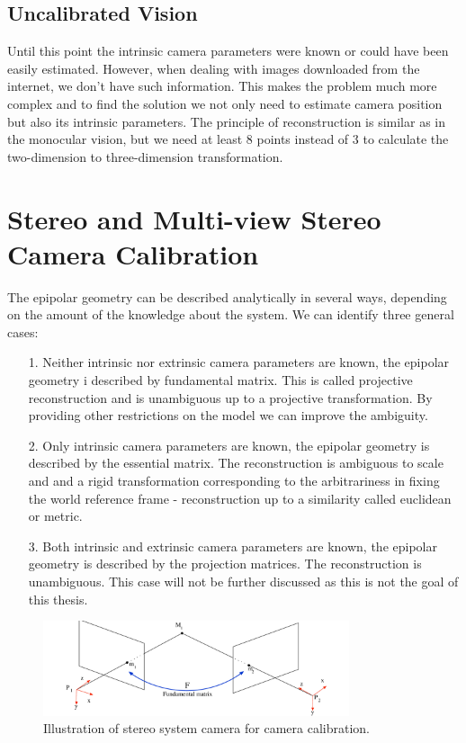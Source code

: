 \subsection*{Uncalibrated Vision}
Until this point the intrinsic camera parameters were known or could have been easily estimated. However, when dealing with images downloaded from the internet, we don't have such information. This makes the problem much more complex and to find the solution we not only need to estimate camera position but also its intrinsic parameters. The principle of reconstruction is similar as in the monocular vision, but we need at least 8 points instead of 3 to calculate the two-dimension to three-dimension transformation.

\section{Stereo and Multi-view Stereo Camera Calibration}
The epipolar geometry can be described analytically in several ways, depending on the amount of the knowledge about the system. We can identify three general cases:
\begin{itemize}
	\item[1.] Neither intrinsic nor extrinsic camera parameters are known, the epipolar geometry i described by fundamental matrix. This is called projective reconstruction and is unambiguous up to a projective transformation. By providing other restrictions on the model we can improve the ambiguity.
	\item[2.] Only intrinsic camera parameters are known, the epipolar geometry is described by the essential matrix. The reconstruction is ambiguous to scale and and a rigid transformation corresponding to the arbitrariness in fixing the world reference frame - reconstruction up to a similarity called euclidean or metric.
	\item[3.] Both intrinsic and extrinsic camera parameters are known, the epipolar geometry is described by the projection matrices. The reconstruction is unambiguous. This case will not be further discussed as this is not the goal of this thesis.
\end{itemize}

\begin{figure}[ht]
	\begin{center}
		\includegraphics[keepaspectratio,width=9cm]{fig/stereo2.pdf}
	\end{center}
	\caption{Illustration of stereo system camera for camera calibration.}
	\label{fig:stereo2}
\end{figure}

